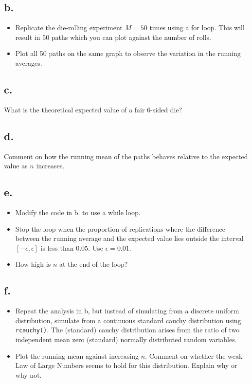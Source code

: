 \documentclass[
]{article}
\begin{document}
\subsection{b.}\label{b.-2}

\begin{itemize}
\item
  Replicate the die-rolling experiment \(M=50\) times using a for loop.
  This will result in \(50\) paths which you can plot against the number
  of rolls.
\item
  Plot all 50 paths on the same graph to observe the variation in the
  running averages.
\end{itemize}

\subsection{c.}\label{c.-2}

What is the theoretical expected value of a fair 6-sided die?

\subsection{d.}\label{d.-1}

Comment on how the running mean of the paths behaves relative to the
expected value as \(n\) increases.

\subsection{e.}\label{e.}

\begin{itemize}
\item
  Modify the code in b. to use a while loop.
\item
  Stop the loop when the proportion of replications where the difference
  between the running average and the expected value lies outside the
  interval \([-\epsilon,\epsilon]\) is less than 0.05. Use
  \(\epsilon = 0.01\).
\item
  How high is \(n\) at the end of the loop?
\end{itemize}

\subsection{f.}\label{f.}

\begin{itemize}
\item
  Repeat the analysis in b, but instead of simulating from a discrete
  uniform distribution, simulate from a continuous standard cauchy
  distribution using \texttt{rcauchy()}. The (standard) cauchy
  distribution arises from the ratio of two independent mean zero
  (standard) normally distributed random variables.
\item
  Plot the running mean against increasing \(n\). Comment on whether the
  weak Law of Large Numbers seems to hold for this distribution. Explain
  why or why not.
\end{itemize}
\end{document}
